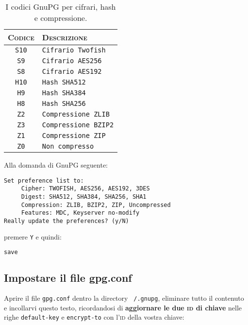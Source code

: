 \documentclass[a4paper,10pt]{article}
\begin{document}
\begin{table}[ht!]
	\begin{tabular}{cl}
 		\hline
		\textsc{Codice} & \textsc{Descrizione} \\
		\hline
		\texttt{S10} & \texttt{Cifrario Twofish} \\
		\texttt{S9} & \texttt{Cifrario AES256} \\
		\texttt{S8} & \texttt{Cifrario AES192} \\
		\texttt{H10} & \texttt{Hash SHA512} \\
		\texttt{H9} & \texttt{Hash SHA384} \\
		\texttt{H8} & \texttt{Hash SHA256} \\
		\texttt{Z2} & \texttt{Compressione ZLIB} \\
		\texttt{Z3} & \texttt{Compressione BZIP2} \\
		\texttt{Z1} & \texttt{Compressione ZIP} \\
		\texttt{Z0} & \texttt{Non compresso} \\
		\hline
	\end{tabular}
	\caption{I codici GnuPG per cifrari, hash e compressione.}
	\label{table:codici}
\end{table}

Alla domanda di GnuPG seguente:

\begin{lstlisting}
Set preference list to:
     Cipher: TWOFISH, AES256, AES192, 3DES
     Digest: SHA512, SHA384, SHA256, SHA1
     Compression: ZLIB, BZIP2, ZIP, Uncompressed
     Features: MDC, Keyserver no-modify
Really update the preferences? (y/N)
\end{lstlisting}

premere \texttt{Y} e quindi:

\begin{lstlisting}
save
\end{lstlisting}

\subsection{Impostare il file gpg.conf}

Aprire il file \texttt{gpg.conf} dentro la directory \texttt{~/.gnupg}, eliminare tutto il contenuto e incollarvi questo testo, ricordandosi di \textbf{aggiornare le due \textsc{id} di chiave} nelle righe \texttt{default-key} e \texttt{encrypt-to} con l'\textsc{id} della vostra chiave:
\end{document}
